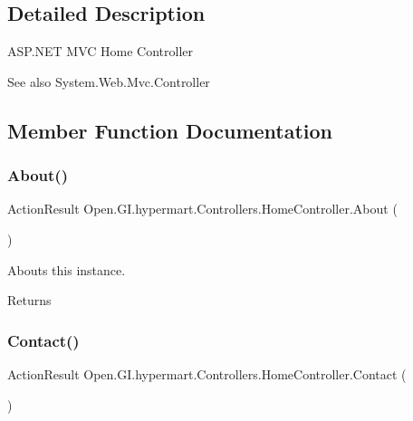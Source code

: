 \subsection{Detailed Description}
A\+S\+P.\+N\+ET M\+VC Home Controller 

\begin{DoxySeeAlso}{See also}
System.\+Web.\+Mvc.\+Controller


\end{DoxySeeAlso}


\subsection{Member Function Documentation}
\hypertarget{class_open_1_1_g_i_1_1hypermart_1_1_controllers_1_1_home_controller_a6d90d2a8ae2ce9f7c9ec38b175847e6f}{}\label{class_open_1_1_g_i_1_1hypermart_1_1_controllers_1_1_home_controller_a6d90d2a8ae2ce9f7c9ec38b175847e6f} 
\subsubsection{\texorpdfstring{About()}{About()}}
{\footnotesize\ttfamily Action\+Result Open.\+G\+I.\+hypermart.\+Controllers.\+Home\+Controller.\+About (\begin{DoxyParamCaption}{ }\end{DoxyParamCaption})}



Abouts this instance. 

\begin{DoxyReturn}{Returns}

\end{DoxyReturn}
\hypertarget{class_open_1_1_g_i_1_1hypermart_1_1_controllers_1_1_home_controller_a758666761af826c9091b8a8655eb5e18}{}\label{class_open_1_1_g_i_1_1hypermart_1_1_controllers_1_1_home_controller_a758666761af826c9091b8a8655eb5e18} 
\subsubsection{\texorpdfstring{Contact()}{Contact()}}
{\footnotesize\ttfamily Action\+Result Open.\+G\+I.\+hypermart.\+Controllers.\+Home\+Controller.\+Contact (\begin{DoxyParamCaption}{ }\end{DoxyParamCaption})}



